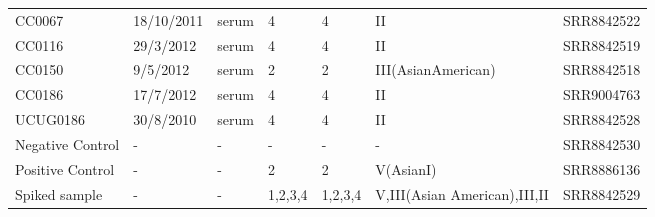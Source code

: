 \begin{table}[h!]
{\begin{tabular}{@{}lllllll@{}}
CC0067           & 18/10/2011 & serum  & 4 & 4 & II                 & SRR8842522 \\
CC0116           & 29/3/2012  & serum  & 4 & 4 & II                 & SRR8842519 \\
CC0150           & 9/5/2012   & serum  & 2 & 2 & III(AsianAmerican) & SRR8842518 \\
CC0186           & 17/7/2012  & serum  & 4 & 4 & II                 & SRR9004763 \\
UCUG0186         & 30/8/2010  & serum  & 4 & 4 & II                 & SRR8842528 \\
Negative Control & -          & -      & - & - & -                  & SRR8842530 \\
Positive Control & -          & -      & 2 & 2 & V(AsianI)          & SRR8886136 \\
Spiked   sample & -                          & -               & 1,2,3,4                    & 1,2,3,4           & V,III(Asian American),III,II & SRR8842529             \\ \bottomrule
\end{tabular}%
}
\end{table}

\newpage

